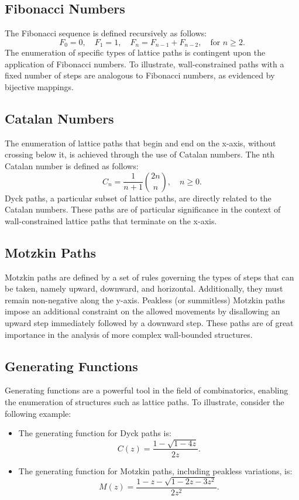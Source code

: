 \documentclass{article}
\begin{document}
\subsection{Fibonacci Numbers}
The Fibonacci sequence is defined recursively as follows:
\[
F_0 = 0, \quad F_1 = 1, \quad F_n = F_{n-1} + F_{n-2}, \quad \text{for } n \geq 2.
\]
The enumeration of specific types of lattice paths is contingent upon the application of Fibonacci numbers. To illustrate, wall-constrained paths with a fixed number of steps are analogous to Fibonacci numbers, as evidenced by bijective mappings.

\subsection{Catalan Numbers}
The enumeration of lattice paths that begin and end on the x-axis, without crossing below it, is achieved through the use of Catalan numbers. The nth Catalan number is defined as follows:
\[
C_n = \frac{1}{n+1} \binom{2n}{n}, \quad n \geq 0.
\]
Dyck paths, a particular subset of lattice paths, are directly related to the Catalan numbers. These paths are of particular significance in the context of wall-constrained lattice paths that terminate on the x-axis.

\subsection{Motzkin Paths}
Motzkin paths are defined by a set of rules governing the types of steps that can be taken, namely upward, downward, and horizontal. Additionally, they must remain non-negative along the y-axis. Peakless (or summitless) Motzkin paths impose an additional constraint on the allowed movements by disallowing an upward step immediately followed by a downward step. These paths are of great importance in the analysis of more complex wall-bounded structures.




\subsection{Generating Functions}
Generating functions are a powerful tool in the field of combinatorics, enabling the enumeration of structures such as lattice paths. To illustrate, consider the following example:
\begin{itemize}
    \item The generating function for Dyck paths is:
    \[
    C(z) = \frac{1 - \sqrt{1 - 4z}}{2z}.
    \]
    \item The generating function for Motzkin paths, including peakless variations, is:
    \[
    M(z) = \frac{1 - z - \sqrt{1 - 2z - 3z^2}}{2z^2}.
    \]
\end{itemize}
\end{document}
